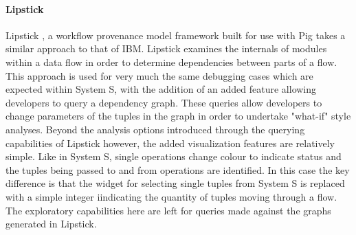 \paragraph{Lipstick}
Lipstick \cite{Amsterdamer2011}, a workflow provenance model framework built for use with Pig takes a similar approach to that of IBM. Lipstick examines the internals of modules within a data flow in order to determine dependencies between parts of a flow. This approach is used for very much the same debugging cases which are expected within System S, with the addition of an added feature allowing developers to query a dependency graph. These queries allow developers to change parameters of the tuples in the graph in order to undertake "what-if" style analyses. Beyond the analysis options introduced through the querying capabilities of Lipstick however, the added visualization features are relatively simple. Like in System S, single operations change colour to indicate status and the tuples being passed to and from operations are identified. In this case the key difference is that the widget for selecting single tuples from System S is replaced with a simple integer iindicating the quantity of tuples moving through a flow. The exploratory capabilities here are left for queries made against the graphs generated in Lipstick.

